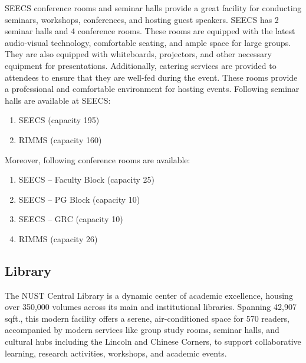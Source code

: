 SEECS conference rooms and seminar halls provide a great facility for conducting
seminars, workshops, conferences, and hosting guest speakers. SEECS has 2 seminar
halls and 4 conference rooms. These rooms are equipped with the latest audio-visual
technology, comfortable seating, and ample space for large groups. They are also
equipped with whiteboards, projectors, and other necessary equipment for
presentations. Additionally, catering services are provided to attendees to ensure
that they are well-fed during the event. These rooms provide a professional and
comfortable environment for hosting events. Following seminar halls are available
at SEECS:

\begin{enumerate}
  \item SEECS (capacity 195)
  \item RIMMS (capacity 160)
\end{enumerate}

Moreover, following conference rooms are available:

\begin{enumerate}
  \item SEECS -- Faculty Block (capacity 25)
  \item SEECS -- PG Block (capacity 10)
  \item SEECS -- GRC (capacity 10)
  \item RIMMS (capacity 26)
\end{enumerate}








\hypertarget{library}{%
\subsection{Library}\label{library}}

The NUST Central Library is a dynamic center of academic excellence, housing over
350,000 volumes across its main and institutional libraries. Spanning 42,907 sqft.,
this modern facility offers a serene, air-conditioned space for 570 readers,
accompanied by modern services like group study rooms, seminar halls, and cultural
hubs including the Lincoln and Chinese Corners, to support collaborative learning,
research activities, workshops, and academic events.

